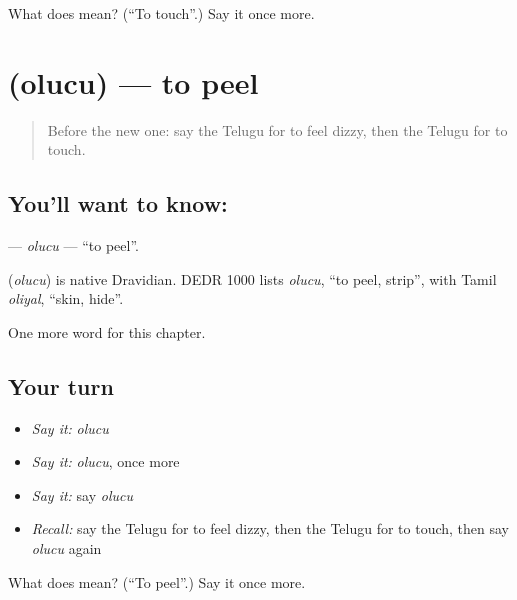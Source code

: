 \begin{tcolorbox}[breakable,colback=teal!4,colframe=teal!35!black,title={Before you move on}]
What does  mean? (\textquotedblleft{}To touch\textquotedblright{}.) Say it once more.
\end{tcolorbox}
\section[\texorpdfstring{\te{ఒలుచు} (olucu)}{ఒలుచు (olucu)}]{ (olucu) — to peel}

\label{lesson:TE-C279-olucu}



\begin{quote}
Before the new one: say the Telugu for to feel dizzy, then the Telugu for to touch.
\end{quote}

\subsection*{You'll want to know: }
\textbf{} — \emph{olucu} — \textquotedblleft{}to peel\textquotedblright{}.

\begin{cousinweb}
\textbf{} (\emph{olucu}) is native Dravidian. DEDR 1000 lists \emph{olucu}, \textquotedblleft{}to peel, strip\textquotedblright{}, with Tamil \emph{oliyal}, \textquotedblleft{}skin, hide\textquotedblright{}.
\end{cousinweb}

\begin{grammarlens}[title={What you've built}]
One more word for this chapter.
\end{grammarlens}

\subsection*{Your turn}
\begin{itemize}
\raggedright
  \item \emph{Say it:} \emph{olucu}
  \item \emph{Say it:} \emph{olucu}, once more
  \item \emph{Say it:} say \emph{olucu}
  \item \emph{Recall:} say the Telugu for to feel dizzy, then the Telugu for to touch, then say \emph{olucu} again
\end{itemize}

\begin{tcolorbox}[breakable,colback=teal!4,colframe=teal!35!black,title={Before you move on}]
What does  mean? (\textquotedblleft{}To peel\textquotedblright{}.) Say it once more.
\end{tcolorbox}

